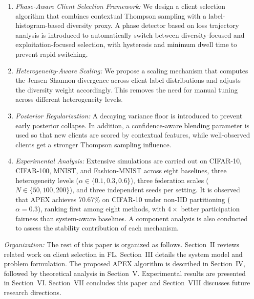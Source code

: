 \documentclass[journal]{IEEEtran}
\begin{document}
\begin{enumerate}
    \item \textit{Phase-Aware Client Selection Framework:} We design a client selection algorithm that combines contextual Thompson sampling with a label-histogram-based diversity proxy. A phase detector based on loss trajectory analysis is introduced to automatically switch between diversity-focused and exploitation-focused selection, with hysteresis and minimum dwell time to prevent rapid switching.

    \item \textit{Heterogeneity-Aware Scaling:} We propose a scaling mechanism that computes the Jensen-Shannon divergence \cite{lin1991divergence} across client label distributions and adjusts the diversity weight accordingly. This removes the need for manual tuning across different heterogeneity levels.

    \item \textit{Posterior Regularization:} A decaying variance floor is introduced to prevent early posterior collapse. In addition, a confidence-aware blending parameter is used so that new clients are scored by contextual features, while well-observed clients get a stronger Thompson sampling influence.

    \item \textit{Experimental Analysis:} Extensive simulations are carried out on CIFAR-10, CIFAR-100, MNIST, and Fashion-MNIST across eight baselines, three heterogeneity levels ($\alpha \in \{0.1, 0.3, 0.6\}$), three federation scales ($N \in \{50, 100, 200\}$), and three independent seeds per setting. It is observed that APEX achieves 70.67\% on CIFAR-10 under non-IID partitioning ($\alpha = 0.3$), ranking first among eight methods, with $4\times$ better participation fairness than system-aware baselines. A component analysis is also conducted to assess the stability contribution of each mechanism.
\end{enumerate}

\textit{Organization:} The rest of this paper is organized as follows. Section~II reviews related work on client selection in FL. Section~III details the system model and problem formulation. The proposed APEX algorithm is described in Section~IV, followed by theoretical analysis in Section~V. Experimental results are presented in Section~VI. Section~VII concludes this paper and Section~VIII discusses future research directions.

\end{document}
